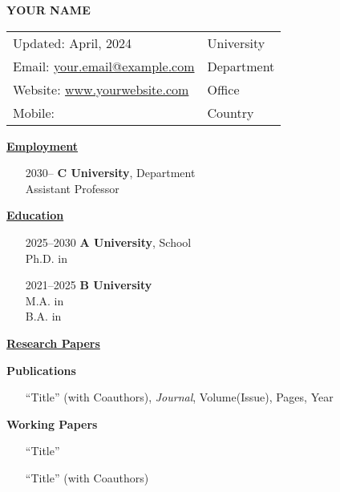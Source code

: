 \documentclass[11pt]{article}
\newcommand{\cvsection}[1]{%
    \vspace{1em}%
    \noindent\textbf{\uline{#1}}%
    \vspace{0.5em}%
}
\begin{document}
\begin{center}
    {\huge\textbf{YOUR NAME}}
    \vspace{1em}
\end{center}

\noindent
\begin{tabular}{@{}p{} p{}}
    Updated: April, 2024 & \raggedleft University  \tabularnewline
    Email: \href{mailto:your.email@example.com}{your.email@example.com} & \raggedleft Department \tabularnewline
    Website: \href{http://www.yourwebsite.com}{www.yourwebsite.com} & \raggedleft Office \tabularnewline
    Mobile: & \raggedleft Country \tabularnewline
\end{tabular}

\cvsection{Employment}
\begin{itemize}[leftmargin=7em, labelwidth=5em, labelsep=1em, itemindent=0em, align=left]
    \item[2030–] \textbf{C University}, Department\\
                      Assistant Professor
\end{itemize}

\cvsection{Education}
\begin{itemize}[leftmargin=7em, labelwidth=5em, labelsep=1em, itemindent=0em, align=left]
    \item[2025–2030] \textbf{A University}, School\\
                      Ph.D. in 
    \item[2021–2025] \textbf{B University}\\
                      M.A. in  \\
                      B.A. in 
\end{itemize}

\cvsection{Research Papers}

\noindent\textbf{Publications}
\begin{itemize}[leftmargin=1em, labelwidth=0em, labelsep=0em, itemindent=0em, align=left]
    \item[] ``Title'' (with Coauthors), \textit{Journal}, Volume(Issue), Pages, Year
\end{itemize}

\noindent\textbf{Working Papers}
\begin{itemize}[leftmargin=1em, labelwidth=0em, labelsep=0em, itemindent=0em, align=left]
    \item[] ``Title''
    \item[] ``Title'' (with Coauthors)
\end{itemize}
\end{document}
